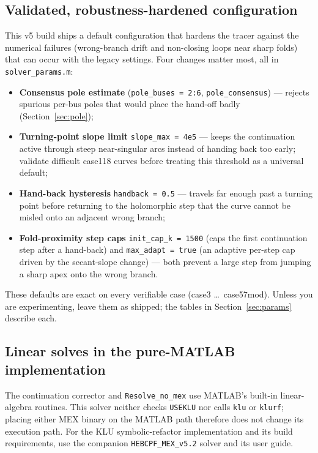 \documentclass[11pt,a4paper]{article}
\newcommand{\code}[1]{\texttt{#1}}
\begin{document}
\subsection{Validated, robustness-hardened configuration}\label{sec:tuned}
This v5 build ships a default configuration that hardens the tracer
against the numerical failures (wrong-branch drift and non-closing loops near sharp folds)
that can occur with the legacy settings. Four changes matter most, all in
\code{solver_params.m}:
\begin{itemize}[leftmargin=1.4em]
  \item \textbf{Consensus pole estimate} (\code{pole_buses = 2:6}, \code{pole_consensus})
        --- rejects spurious per-bus poles that would place the hand-off badly
        (Section~\ref{sec:pole});
  \item \textbf{Turning-point slope limit} \code{slope_max = 4e5} --- keeps the
        continuation active through steep near-singular arcs instead of handing back too
        early; validate difficult case118 curves before treating this threshold as a
        universal default;
  \item \textbf{Hand-back hysteresis} \code{handback = 0.5} --- travels far enough past a
        turning point before returning to the holomorphic step that the curve cannot be
        misled onto an adjacent wrong branch;
  \item \textbf{Fold-proximity step caps} \code{init_cap_k = 1500} (caps the first
        continuation step after a hand-back) and \code{max_adapt = true} (an adaptive
        per-step cap driven by the secant-slope change) --- both prevent a large step from
        jumping a sharp apex onto the wrong branch.
\end{itemize}
These defaults are exact on every verifiable case (case3 \dots\ case57mod). Unless you are
experimenting, leave them as shipped; the tables in Section~\ref{sec:params} describe each.

\subsection{Linear solves in the pure-MATLAB implementation}\label{sec:linear}
The continuation corrector and \code{Resolve_no_mex} use MATLAB's built-in linear-algebra
routines. This solver neither checks \code{USEKLU} nor calls \code{klu} or \code{klurf};
placing either MEX binary on the MATLAB path therefore does not change its execution path.
For the KLU symbolic-refactor implementation and its build requirements, use the companion
\code{HEBCPF_MEX_v5.2} solver and its user guide.
\end{document}

